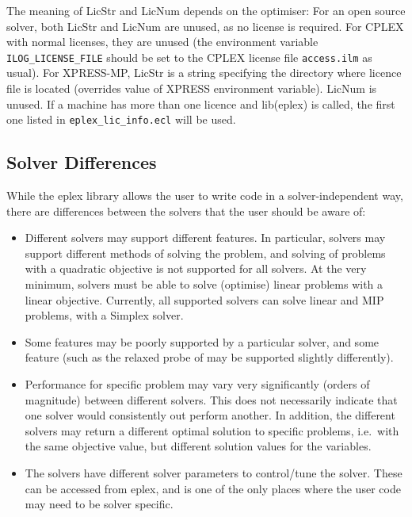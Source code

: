 The meaning of LicStr and LicNum depends on the optimiser:
For an open source solver, both LicStr and LicNum are unused, as no license
is required.
For CPLEX with normal licenses, they are unused (the environment
variable \verb'ILOG_LICENSE_FILE' should be set to the CPLEX
license file \verb'access.ilm' as usual). 
For XPRESS-MP,
LicStr is a string specifying the directory where
licence file is located (overrides value of XPRESS environment
variable). LicNum is unused. %
If a machine has more than one licence and lib(eplex) is called, the
first one listed in \verb+eplex_lic_info.ecl+ will be used.

\subsection{Solver Differences}

While the eplex library allows the user to write code in a
solver-independent way, there are differences between the solvers that
the user should be aware of:

\begin{itemize}
\item Different solvers may support different features. In particular,
solvers may support different methods of solving the problem, and solving
 of problems with a quadratic objective is not supported for all solvers.
At the very minimum, solvers must be able to solve (optimise) linear
 problems with a linear objective. Currently, all supported solvers can
 solve linear and MIP problems, with a Simplex solver.
\item Some features may be poorly supported by a particular solver, and
 some feature (such as the relaxed probe of 
 may be
supported slightly differently).
\item Performance for specific problem may vary very significantly (orders
of magnitude) between different solvers. This does not necessarily indicate 
that one solver would consistently out perform another. In addition, the
different solvers may return a different optimal solution to specific
problems, i.e.\ with the same objective value, but different solution
values for the variables.
\item The solvers have different solver parameters to control/tune the
solver. These can be accessed from eplex, and is one of the only places
 where the user code may need to be solver specific.
\end{itemize}

